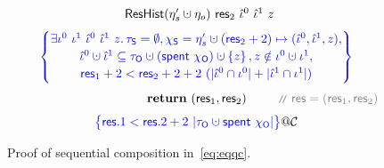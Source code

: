 \begin{figure}
\[{{\begin{array}{c}
{\begin{array}{c}
  \happrox (\gists' \hunion \gisto)~\res_2~\iknh^0~\iknh^1~z
\end{array}
\!\!\!}
\\\\[-5pt]
\spec{\!\!\!
\begin{array}{c}
  \exists \ikn^0~\ikn^1~\iknh^0~\iknh^1~z \ldot     
  \tkns = \emptyset, \hists = \gists' \hunion (\res_2+2) \mapsto (\iknh^0, \iknh^1, z),\\[2pt]
  \iknh^0 \hunion \iknh^1 \subseteq \tkno \hunion (\Tomb~\histo) \hunion \set{z}\aand z \notin \ikn^0 \hunion \ikn^1,\\[2pt] 
  \res_1 + 2 < \res_2 + 2 + 2 \ (|\iknh^0 \cap \ikn^0| + |\iknh^1 \cap \ikn^1|)
\end{array}
\!\!\!}
\\\\[-5pt]  
~~~~~~~~~~~~~~~~~~~~~~~~~~~~~~~~
\kw{return}~(\res_1, \res_2) ~\comm{\res = (\res_1, \res_2)}
\\\\[-5pt]
\spec{\!\!\!
\begin{array}{c}
  \res.1 < \res.2 + 2 \ |\tkno \hunion \Tomb~\histo| 
  \end{array}
  \!\!\!}@\ccon
\end{array}
}} 
\]
%
%
\caption{Proof of sequential composition in~\eqref{eq:eqqc}.}
\label{fig:proof2}
\end{figure}

